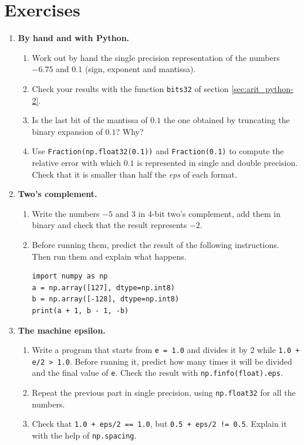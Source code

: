 \section{Exercises}
\begin{enumerate}
\item \label{ej:ieee_mano-en} \textbf{By hand and with Python.}
\begin{enumerate}
\item Work out by hand the single precision representation of the numbers $-6.75$ and $0.1$ (sign, exponent and mantissa).
\item Check your results with the function \texttt{bits32} of section \ref{sec:arit_python-2}.
\item Is the last bit of the mantissa of $0.1$ the one obtained by truncating the binary expansion of $0.1$? Why?
\item Use \texttt{Fraction(np.float32(0.1))} and \texttt{Fraction(0.1)} to compute the relative error with which $0.1$ is represented in single and double precision. Check that it is smaller than half the \emph{eps} of each format.
\end{enumerate}

\item \textbf{Two's complement.}
\begin{enumerate}
\item Write the numbers $-5$ and $3$ in 4-bit two's complement, add them in binary and check that the result represents $-2$.
\item Before running them, predict the result of the following instructions. Then run them and explain what happens.
\begin{verbatim}
import numpy as np
a = np.array([127], dtype=np.int8)
b = np.array([-128], dtype=np.int8)
print(a + 1, b - 1, -b)
\end{verbatim}
\end{enumerate}

\item \textbf{The machine epsilon.}
\begin{enumerate}
\item Write a program that starts from \texttt{e = 1.0} and divides it by 2 while \texttt{1.0 + e/2 > 1.0}. Before running it, predict how many times it will be divided and the final value of \texttt{e}. Check the result with \texttt{np.finfo(float).eps}.
\item Repeat the previous part in single precision, using \texttt{np.float32} for all the numbers.
\item Check that \texttt{1.0 + eps/2 == 1.0}, but \texttt{0.5 + eps/2 != 0.5}. Explain it with the help of \texttt{np.spacing}.
\end{enumerate}


\end{enumerate}
